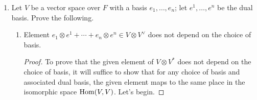 \documentclass[../psets.tex]{subfiles}
\begin{document}
\begin{enumerate}
\begin{enumerate}
\begin{proof}
            \begin{align*}
                \sigma(\alpha\cdot\alpha\cdot\alpha) &= \beta\cdot\beta\cdot\beta&
                \sigma(\alpha\cdot\alpha\cdot\beta) &= \alpha\cdot\beta\cdot\beta
            \end{align*}
            \begin{align*}
                \sigma(\alpha\cdot\beta\cdot\beta) &= \alpha\cdot\alpha\cdot\beta&
                \sigma(\beta\cdot\beta\cdot\beta) &= \alpha\cdot\alpha\cdot\alpha
            \end{align*}
            Thus, $\alpha\cdot\alpha\cdot\beta$ and $\alpha\cdot\beta\cdot\beta$ span a standard representation, $\alpha\cdot\alpha\cdot\alpha+\beta\cdot\beta\cdot\beta$ spans a trivial representation, and $\alpha\cdot\alpha\cdot\alpha-\beta\cdot\beta\cdot\beta$ spans an alternating representation. Putting everything together, we obtain
            \begin{equation*}
                \boxed{S^3(2,1) \cong (2,1)\oplus(3)\oplus(1,1,1)}
            \end{equation*}
        \end{proof}
        \item Decompose the regular representation $R$ into irreducibles.
        \begin{proof}
            The regular representation is 6-dimensional. We're in $\C^6$ with basis $\{e_e,e_{(12)},e_{(13)},e_{(23)},e_{(123)},e_{(132)}\}$. Let $\tau=(123)$ again. We get $\tau(1,1,1,1,1,1)=1(1,1,1,1,1,1)$.
            We have $\tau v_1=\omega^{\alpha_1}v_1$
        \end{proof}
        \item Prove that $S^{k+6}(2,1)\cong S^k(2,1)\oplus R$. Compute $S^k(2,1)$ for all $k$.
    \end{enumerate}
    \item Let $V$ be a vector space over $F$ with a basis $e_1,\dots,e_n$; let $e^1,\dots,e^n$ be the dual basis. Prove the following.
    \begin{enumerate}
        \item Element $e_1\otimes e^1+\cdots+e_n\otimes e^n\in V\otimes V^\vee$ does not depend on the choice of basis.
        \begin{proof}
            To prove that the given element of $V\otimes V^*$ does not depend on the choice of basis, it will suffice to show that for any choice of basis and associated dual basis, the given element maps to the same place in the isomorphic space $\operatorname{Hom}(V,V)$. Let's begin.\par

\end{proof}
\end{enumerate}
\end{enumerate}
\end{document}
